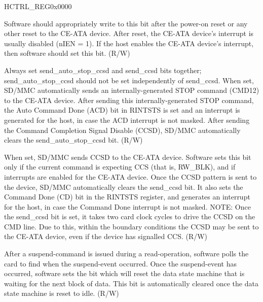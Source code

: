 \begin{register}{H}{CTRL\_REG}{0x0000}\label{regdesc:CTRLREG}
%
%
%
%
%
%
%
%
%
%
%
%
%
%
%
\regnewline%
\begin{regdesc}\begin{reglist}
\item [CEATA\_DEVICE\_INTERRUPT\_STATUS]Software should appropriately write to this bit after the power-on reset or any other reset to the CE-ATA device. After reset, the CE-ATA device's interrupt is usually disabled (nIEN = 1). If the host enables the CE-ATA device's interrupt, then software should set this bit. (R/W)
\item [SEND\_AUTO\_STOP\_CCSD]Always set send\_auto\_stop\_ccsd and send\_ccsd bits together; send\_auto\_stop\_ccsd should not be set independently of send\_ccsd. When set, SD/MMC automatically sends an internally-generated STOP command (CMD12) to the CE-ATA device. After sending this internally-generated STOP command, the Auto Command Done (ACD) bit in RINTSTS is set and an interrupt is generated for the host, in case the ACD interrupt is not masked. After sending the Command Completion Signal Disable (CCSD), SD/MMC automatically clears the send\_auto\_stop\_ccsd bit. (R/W)
\item [SEND\_CCSD]When set, SD/MMC sends CCSD to the CE-ATA device. Software sets this bit only if the current command is expecting CCS (that is, RW\_BLK), and if interrupts are enabled for the CE-ATA device. Once the CCSD pattern is sent to the device, SD/MMC automatically clears the send\_ccsd bit. It also sets the Command Done (CD) bit  in the RINTSTS register, and generates an interrupt for the host, in case the Command Done interrupt is not masked.
NOTE: Once the send\_ccsd bit is set, it takes two card clock cycles to drive the CCSD on the CMD line. Due to this, within the boundary conditions the CCSD may be sent to the CE-ATA device, even if the device has signalled CCS. (R/W)
\item [ABORT\_READ\_DATA]After a suspend-command is issued during a read-operation, software polls the card to find when the suspend-event occurred. Once the suspend-event has occurred, software sets the bit which will reset the data state machine that is waiting for the next block of data. This bit is automatically cleared once the data state machine is reset to idle. (R/W)

\end{reglist}
\end{regdesc}
\end{register}
